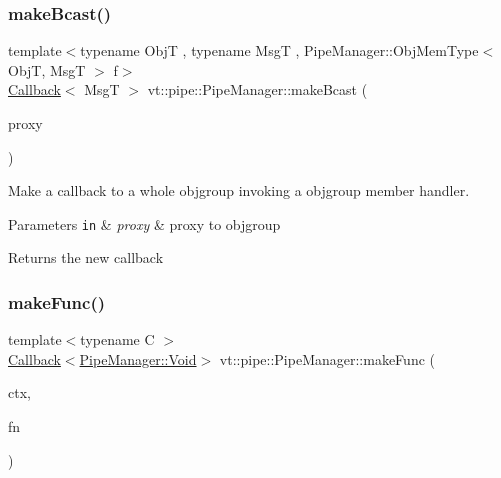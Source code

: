 \subsubsection{\texorpdfstring{make\+Bcast()}{makeBcast()}\hspace{0.1cm}{\footnotesize\ttfamily [6/6]}}
{\footnotesize\ttfamily template$<$typename ObjT , typename MsgT , Pipe\+Manager\+::\+Obj\+Mem\+Type$<$ Obj\+T, Msg\+T $>$ f$>$ \\
\hyperlink{namespacevt_a36db99df4c973d48b1118a293fff533f}{Callback}$<$ MsgT $>$ vt\+::pipe\+::\+Pipe\+Manager\+::make\+Bcast (\begin{DoxyParamCaption}\item[{\hyperlink{structvt_1_1objgroup_1_1proxy_1_1_proxy}{objgroup\+::proxy\+::\+Proxy}$<$ ObjT $>$}]{proxy }\end{DoxyParamCaption})}



Make a callback to a whole objgroup invoking a objgroup member handler. 


\begin{DoxyParams}[1]{Parameters}
\mbox{\tt in}  & {\em proxy} & proxy to objgroup\\
\hline
\end{DoxyParams}
\begin{DoxyReturn}{Returns}
the new callback 
\end{DoxyReturn}
\mbox{\label{structvt_1_1pipe_1_1_pipe_manager_a64be0df0367ac73feff93acdd11f9a09}} 
\subsubsection{\texorpdfstring{make\+Func()}{makeFunc()}\hspace{0.1cm}{\footnotesize\ttfamily [1/6]}}
{\footnotesize\ttfamily template$<$typename C $>$ \\
\hyperlink{namespacevt_a36db99df4c973d48b1118a293fff533f}{Callback}$<$\hyperlink{structvt_1_1pipe_1_1_pipe_manager_ab720c2580ecfd3ab36e49aeaaff64cc6}{Pipe\+Manager\+::\+Void}$>$ vt\+::pipe\+::\+Pipe\+Manager\+::make\+Func (\begin{DoxyParamCaption}\item[{C $\ast$}]{ctx,  }\item[{\hyperlink{structvt_1_1pipe_1_1_pipe_manager_base_ad8463823b6b4cfdb67c119d6d22e3bac}{Func\+Ctx\+Type}$<$ C $>$}]{fn }\end{DoxyParamCaption})}


